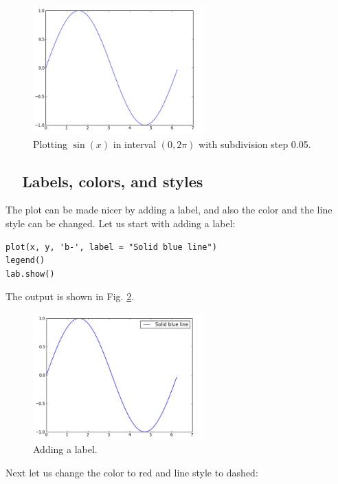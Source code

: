 \begin{figure}[!ht]
\begin{center}
\includegraphics[width=0.6\textwidth]{imgp/plot1.png}
\end{center}
\vspace{-6mm}
\caption{Plotting $\sin(x)$ in interval $(0, 2\pi)$ with subdivision step 0.05.}
\label{fig:plot1}
\vspace{-2mm}
\end{figure}
\noindent

\subsection{\ \ Labels, colors, and styles}

The plot can be made nicer by adding a label, and also the color 
and the line style can be changed. Let us start with adding a label:

\begin{verbatim}
plot(x, y, 'b-', label = "Solid blue line")
legend()
lab.show()
\end{verbatim}
The output is shown in Fig. \ref{fig:plot2}.\\[-7mm]

\begin{figure}[!ht]
\begin{center}
\includegraphics[width=0.6\textwidth]{imgp/plot2.png}
\end{center}
\vspace{-6mm}
\caption{Adding a label.}
\label{fig:plot2}
\end{figure}
\newpage
\noindent
Next let us change the color to red and line style to dashed: 

